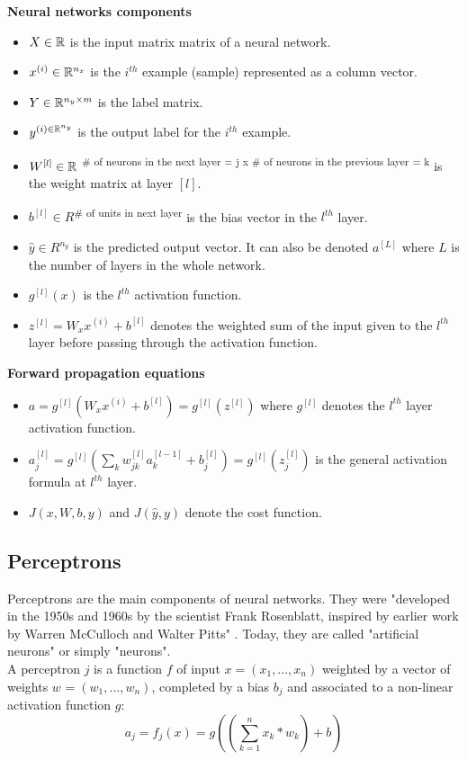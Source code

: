 \noindent \textbf{Neural networks components}
\begin{itemize}
\item $X\in \mathbb{R}$ is the input matrix matrix of a neural network.
\item $x^{(i)} \in \mathbb{R}^{n_{x}}$ is the $i^{th}$ example (sample) represented as a column vector.
\item $Y \in \mathbb{R}^{n_{y} \times m}$ is the label matrix.
\item $y^{(i) \in \mathbb{R}^{n_{y}}}$ is the output label for the $i^{th}$ example.
\item $W^{[l]} \in \mathbb{R}$ \textsuperscript{\# of neurons in the next layer = j  x \# of neurons in the previous layer = k} is the weight matrix at layer $[l]$.
\item $b^{[l]} \in R$\textsuperscript{\# of units in next layer} is the bias vector in the $l^{th}$ layer.
\item $\hat{y} \in R^{n_{y}}$ is the predicted output vector. It can also be denoted $a^{[L]}$ where $L$ is the number of layers in the whole network.
\item $g^{[l]}(x)$ is the $l^{th}$ activation function.  
\item $z^{[l]} = W_{x}x^{(i)} + b^{[l]}$ denotes the weighted sum of the input given to the $l^{th}$ layer before passing through the activation function.\\
\end{itemize}

\noindent \textbf{Forward propagation equations}
\begin{itemize}
\item $a = g^{[l]}(W_{x}x^{(i)} + b^{[l]}) = g^{[l]}(z^{[l]})$ where $g^{[l]}$ denotes the $l^{th}$ layer activation function.
\item $a_{j}^{[l]} = g^{[l]} (\sum_{k} w_{jk}^{[l]}a_{k}^{[l-1]} + b_{j}^{[l]}) = g^{[l]} (z_{j}^{[l]}) $ is the general activation formula at $l^{th}$ layer.
\item $J(x, W, b, y)$ and $J(\hat{y}, y)$ denote the cost function.
\end{itemize}

\subsection{Perceptrons}
\label{perceptron}
Perceptrons are the main components of neural networks. They were "developed in the 1950s and 1960s by the scientist Frank Rosenblatt, inspired by earlier work by Warren McCulloch and Walter Pitts" \cite{13}. Today, they are called "artificial neurons" or simply "neurons".\\
A perceptron $j$ is a function $f$ of input $x=(x_{1}, ..., x_{n})$ weighted by a vector of weights $w_{}=(w_{1}, ..., w_{n})$, completed by a bias $b_{j}$ and associated to a non-linear activation function $g$:
\begin{equation}
\label{perceptron_equation}
a_{j} = f_{j}(x) = g((\sum_{k=1}^{n} x_{k} * w_{k}) + b_{})
\end{equation}

